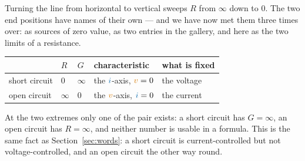 \documentclass[11pt,a4paper]{article}
\newcommand{\Icol}[1]{\textcolor{ccur}{#1}}
\newcommand{\Vcol}[1]{\textcolor{cvolt}{#1}}
\newcommand{\uni}[1]{\,\mathrm{#1}}
\newcommand{\W}{\uni{W}}   \newcommand{\J}{\uni{J}}
\newcommand{\viaxes}[3]{%
  \draw[vax] (-#1,0) -- (#1,0) node[right=1pt, font=\scriptsize, text=cvolt] {$v$};
  \draw[vax] (0,-#2) -- (0,#2) node[above=1pt, font=\scriptsize, text=ccur] {$i$};
  \node[ttl] at (0,-#2-0.68) {#3};}
\begin{document}
\begin{center}
\end{center}
\vspace{2pt}

Turning the line from horizontal to vertical sweeps $R$ from $\infty$ down to $0$. The two
end positions have names of their own --- and we have now met them three times over: as
sources of zero value, as two entries in the gallery, and here as the two limits of a
resistance.

\begin{center}
\small
\begin{tabular}{@{}l l l l l@{}}
\toprule
 & \textbf{$R$} & \textbf{$G$} & \textbf{characteristic} & \textbf{what is fixed}\\
\midrule
short circuit & $0$      & $\infty$ & the $\Icol{i}$-axis, $\Vcol{v} = 0$ & the voltage\\
open circuit  & $\infty$ & $0$      & the $\Vcol{v}$-axis, $\Icol{i} = 0$ & the current\\
\bottomrule
\end{tabular}
\end{center}

\begin{cautionbox}[$G = 1/R$ is not always available]
At the two extremes only one of the pair exists: a short circuit has $G = \infty$, an open
circuit has $R = \infty$, and neither number is usable in a formula. This is the same fact
as Section~\ref{sec:words}: a short circuit is current-controlled but not
voltage-controlled, and an open circuit the other way round.
\end{cautionbox}
\end{document}
